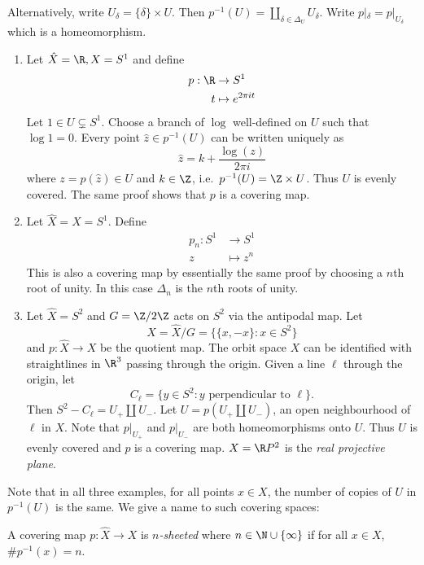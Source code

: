 \documentclass[a4paper]{article}
\begin{document}
Alternatively, write \(U_\delta = \{\delta\} \times U\). Then \(p^{-1}(U) = \coprod_{\delta \in \Delta_U} U_\delta\). Write \(p|_\delta = p|_{U_\delta}\) which is a homeomorphism.

\begin{eg}\leavevmode
  \begin{enumerate}
  \item Let \(\hat X = \R, X = S^1\) and define
  \begin{align*}
    p: \R &\to S^1 \\
    t &\mapsto e^{2\pi i t}
  \end{align*}
  Let \(1 \in U \subsetneq S^1\). Choose a branch of \(\log\) well-defined on \(U\) such that \(\log 1 = 0\). Every point \(\hat z \in p^{-1}(U)\) can be written uniquely as
  \[
    \hat z = k + \frac{\log(z)}{2\pi i}
  \]
  where \(z = p(\hat z) \in U\) and \(k \in \Z\), i.e.\ \(p^{-1}(U) = \Z \times U\). Thus \(U\) is evenly covered. The same proof shows that \(p\) is a covering map.
\item Let \(\hat X = X = S^1\). Define
  \begin{align*}
    p_n: S^1 &\to S^1 \\
    z &\mapsto z^n
  \end{align*}
  This is also a covering map by essentially the same proof by choosing a \(n\)th root of unity. In this case \(\Delta_n\) is the \(n\)th roots of unity.
\item Let \(\hat X = S^2\) and \(G = \Z/2\Z\) acts on \(S^2\) via the antipodal map. Let
  \[
    X = \hat X / G = \{\{x, -x\}: x \in S^2\}
  \]
  and \(p: \hat X \to X\) be the quotient map. The orbit space \(X\) can be identified with straightlines in \(\R^3\) passing through the origin. Given a line \(\ell\) through the origin, let
  \[
    C_\ell = \{y \in S^2: y \text{ perpendicular to } \ell\}.
  \]
  Then \(S^2 - C_\ell = U_+ \amalg U_-\). Let \(U = p(U_+ \amalg U_-)\), an open neighbourhood of \(\ell\) in \(X\). Note that \(p|_{U_+}\) and \(p|_{U_-}\) are both homeomorphisms onto \(U\). Thus \(U\) is evenly covered and \(p\) is a covering map. \(X = \R P^2\) is the \emph{real projective plane}.
\end{enumerate}
\end{eg}

Note that in all three examples, for all points \(x \in X\), the number of copies of \(U\) in \(p^{-1}(U)\) is the same. We give a name to such covering spaces:

\begin{definition}[\(n\)-sheeted]
  A covering map \(p: \hat X \to X\) is \emph{\(n\)-sheeted} where \(n \in \N \cup \{\infty\}\) if for all \(x \in X\), \(\# p^{-1}(x) = n\).
\end{definition}
\end{document}
